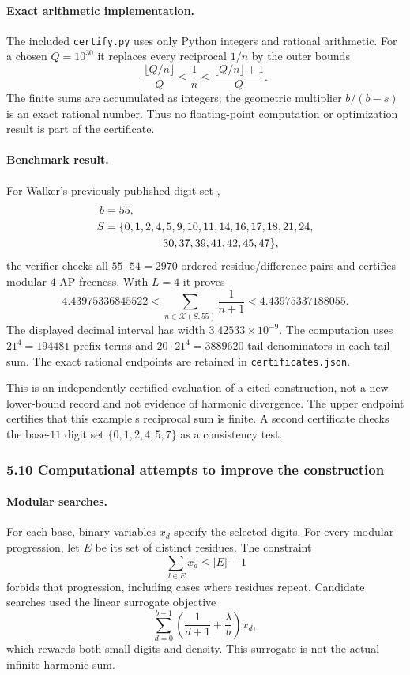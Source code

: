 \paragraph{Exact arithmetic implementation.}
The included \texttt{certify.py} uses only Python integers and rational arithmetic. For a chosen $Q=10^{30}$ it replaces every reciprocal $1/n$ by the outer bounds
\[
\frac{\lfloor Q/n\rfloor}{Q}\le\frac1n
\le\frac{\lfloor Q/n\rfloor+1}{Q}.
\]
The finite sums are accumulated as integers; the geometric multiplier $b/(b-s)$ is an exact rational number. Thus no floating-point computation or optimization result is part of the certificate.

\paragraph{Benchmark result.}
For Walker's previously published digit set \cite{walker},
\[
\begin{split}
b={}&55,\\
S={}&\{0,1,2,4,5,9,10,11,14,16,17,18,21,24,\\
&\hspace{14mm}30,37,39,41,42,45,47\},
\end{split}
\]
the verifier checks all $55\cdot54=2970$ ordered residue/difference pairs and certifies modular $4$-AP-freeness. With $L=4$ it proves
\begin{equation}\label{r2:numeric}
4.43975336845522
<\sum_{n\in\mathcal K(S,55)}\frac1{n+1}
<4.43975337188055.
\end{equation}
The displayed decimal interval has width $3.42533\times10^{-9}$. The computation uses $21^4=194481$ prefix terms and $20\cdot21^4=3889620$ tail denominators in each tail sum. The exact rational endpoints are retained in \texttt{certificates.json}.

This is an independently certified evaluation of a cited construction, not a new lower-bound record and not evidence of harmonic divergence. The upper endpoint certifies that this example's reciprocal sum is finite. A second certificate checks the base-$11$ digit set $\{0,1,2,4,5,7\}$ as a consistency test.

\subsubsection{5.10 Computational attempts to improve the construction}

\paragraph{Modular searches.}
For each base, binary variables $x_d$ specify the selected digits. For every modular progression, let $E$ be its set of distinct residues. The constraint
\[
\sum_{d\in E}x_d\le |E|-1
\]
forbids that progression, including cases where residues repeat. Candidate searches used the linear surrogate objective
\[
\sum_{d=0}^{b-1}\left(\frac1{d+1}+\frac{\lambda}{b}\right)x_d,
\]
which rewards both small digits and density. This surrogate is not the actual infinite harmonic sum.

